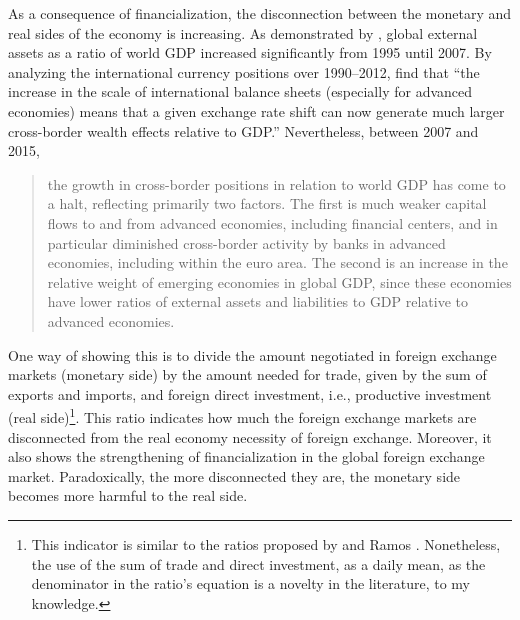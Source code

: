\documentclass[a4paper, twoside]{templates/ociamthesis}
\begin{document}
As a consequence of financialization, the disconnection between the monetary and real sides of the economy is increasing. As demonstrated by \textcite{lane2018}, global external assets as a ratio of world GDP increased significantly from 1995 until 2007. By analyzing the international currency positions over 1990--2012, \textcite[ S108]{benetrix2015} find that ``the increase in the scale of international balance sheets (especially for advanced economies) means that a given exchange rate shift can now generate much larger cross-border wealth effects relative to GDP.'' Nevertheless, between 2007 and 2015,

\begin{quote}
the growth in cross-border positions in relation to world GDP has come to a halt, reflecting primarily two factors. The first is much weaker capital flows to and from advanced economies, including financial centers, and in particular diminished cross-border activity by banks in advanced economies, including within the euro area. The second is an increase in the relative weight of emerging economies in global GDP, since these economies have lower ratios of external assets and liabilities to GDP relative to advanced economies. \autocite[ 190]{lane2018}
\end{quote}

One way of showing this is to divide the amount negotiated in foreign exchange markets (monetary side) by the amount needed for trade, given by the sum of exports and imports, and foreign direct investment, i.e., productive investment (real side)\footnote{This indicator is similar to the ratios proposed by \textcite{mccauley2011} and Ramos \autocite*{ramos2016,ramos2017}. Nonetheless, the use of the sum of trade and direct investment, as a daily mean, as the denominator in the ratio's equation is a novelty in the literature, to my knowledge.}. This ratio indicates how much the foreign exchange markets are disconnected from the real economy necessity of foreign exchange. Moreover, it also shows the strengthening of financialization in the global foreign exchange market. Paradoxically, the more disconnected they are, the monetary side becomes more harmful to the real side.
\end{document}
